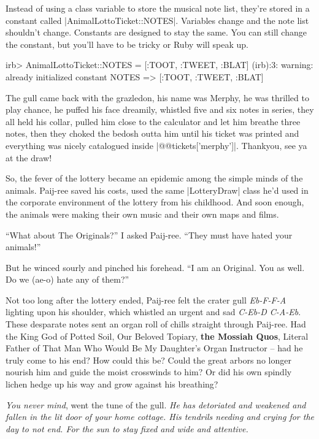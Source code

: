 \documentclass[12pt,twoside]{report}
\begin{document}
Instead of using a class variable to store the musical note list,
they're stored in a constant called
\rubyinline|AnimalLottoTicket::NOTES|.  Variables
change and the note list shouldn't change.  Constants are designed to
stay the same.  You can still change the constant, but you'll have to
be tricky or Ruby will speak up.


\begin{consolecode}

 irb> AnimalLottoTicket::NOTES = [:TOOT, :TWEET, :BLAT]
 (irb):3: warning: already initialized constant NOTES
   => [:TOOT, :TWEET, :BLAT]

\end{consolecode}


The gull came back with the grazledon, his name was Merphy, he was
thrilled to play chance, he puffed his face dreamily, whistled five
and six notes in series, they all held his collar, pulled him close to
the calculator and let him breathe three notes, then they choked the
bedosh outta him until his ticket was printed and everything was
nicely catalogued inside
\rubyinline|@@tickets['merphy']|.  Thankyou, see ya at
the draw!

So, the fever of the lottery became an epidemic among the simple minds
of the animals.  Paij-ree saved his costs, used the same
\rubyinline|LotteryDraw| class he'd used in the
corporate environment of the lottery from his childhood.  And soon
enough, the animals were making their own music and their own maps and
films.

``What about The Originals?'' I asked Paij-ree.  ``They must have
hated your animals!''

But he winced sourly and pinched his forehead.  ``I am an Original.
You as well. Do we (ae-o) hate any of them?''

Not too long after the lottery ended, Paij-ree felt the crater gull
{\em Eb-F-F-A} lighting upon his shoulder, which whistled an urgent
and sad {\em C-Eb-D C-A-Eb}. These desparate notes sent an organ roll
of chills straight through Paij-ree.  Had the King God of Potted Soil,
Our Beloved Topiary, {\bf the Mossiah Quos}, Literal Father of That
Man Who Would Be My Daughter's Organ Instructor -- had he truly come
to his end? How could this be?  Could the great arbors no longer
nourish him and guide the moist crosswinds to him?  Or did his own
spindly lichen hedge up his way and grow against his breathing?

{\em You never mind}, went the tune of the gull.  {\em He has
  detoriated and weakened and fallen in the lit door of your home
  cottage.  His tendrils needing and crying for the day to not
  end. For the sun to stay fixed and wide and attentive.}
\end{document}
